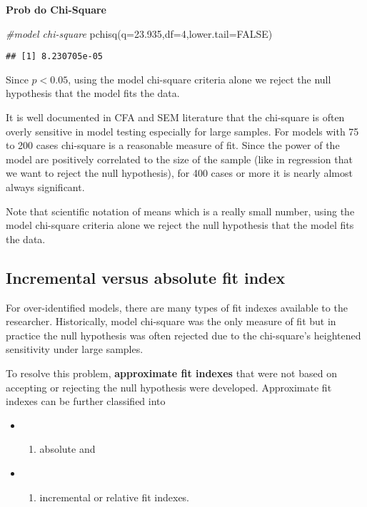 \documentclass[
]{article}
\newenvironment{Shaded}{\begin{snugshade}}{\end{snugshade}}
\newcommand{\AttributeTok}[1]{\textcolor[rgb]{0.77,0.63,0.00}{#1}}
\newcommand{\CommentTok}[1]{\textcolor[rgb]{0.56,0.35,0.01}{\textit{#1}}}
\newcommand{\ConstantTok}[1]{\textcolor[rgb]{0.00,0.00,0.00}{#1}}
\newcommand{\DecValTok}[1]{\textcolor[rgb]{0.00,0.00,0.81}{#1}}
\newcommand{\FloatTok}[1]{\textcolor[rgb]{0.00,0.00,0.81}{#1}}
\newcommand{\FunctionTok}[1]{\textcolor[rgb]{0.00,0.00,0.00}{#1}}
\newcommand{\NormalTok}[1]{#1}
\providecommand{\tightlist}{%
  \setlength{\itemsep}{0pt}\setlength{\parskip}{0pt}}
\begin{document}
\textbf{Prob do Chi-Square}

\begin{Shaded}
\begin{Highlighting}[]
\CommentTok{\#model chi{-}square}
\FunctionTok{pchisq}\NormalTok{(}\AttributeTok{q=}\FloatTok{23.935}\NormalTok{,}\AttributeTok{df=}\DecValTok{4}\NormalTok{,}\AttributeTok{lower.tail=}\ConstantTok{FALSE}\NormalTok{)}
\end{Highlighting}
\end{Shaded}

\begin{verbatim}
## [1] 8.230705e-05
\end{verbatim}

Since \(p<0.05\), using the model chi-square criteria alone we reject
the null hypothesis that the model fits the data.

It is well documented in CFA and SEM literature that the chi-square is
often overly sensitive in model testing especially for large samples.
For models with 75 to 200 cases chi-square is a reasonable measure of
fit. Since the power of the model are positively correlated to the size
of the sample (like in regression that we want to reject the null
hypothesis), for 400 cases or more it is nearly almost always
significant.

Note that scientific notation of means which is a really small number,
using the model chi-square criteria alone we reject the null hypothesis
that the model fits the data.

\hypertarget{incremental-versus-absolute-fit-index}{%
\subsection{Incremental versus absolute fit
index}\label{incremental-versus-absolute-fit-index}}

For over-identified models, there are many types of fit indexes
available to the researcher. Historically, model chi-square was the only
measure of fit but in practice the null hypothesis was often rejected
due to the chi-square's heightened sensitivity under large samples.

To resolve this problem, \textbf{approximate fit indexes} that were not
based on accepting or rejecting the null hypothesis were developed.
Approximate fit indexes can be further classified into

\begin{itemize}
\item
  \begin{enumerate}
  \def\labelenumi{\alph{enumi})}
  \tightlist
  \item
    absolute and
  \end{enumerate}
\item
  \begin{enumerate}
  \def\labelenumi{\alph{enumi})}
  \setcounter{enumi}{1}
  \tightlist
  \item
    incremental or relative fit indexes.
  \end{enumerate}
\end{itemize}
\end{document}
